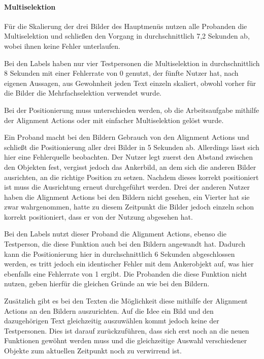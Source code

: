 \paragraph{Multiselektion}
Für die Skalierung der drei Bilder des Hauptmenüs nutzen alle Probanden die Multiselektion und schließen den Vorgang in durchschnittlich 7,2 Sekunden ab, wobei ihnen keine Fehler unterlaufen.

Bei den Labels haben nur vier Testpersonen die Multiselektion in durchschnittlich 8 Sekunden mit einer Fehlerrate von 0 genutzt, der fünfte Nutzer hat, nach eigenen Aussagen, aus Gewohnheit jeden Text einzeln skaliert, obwohl vorher für die Bilder die Mehrfachselektion verwendet wurde.

Bei der Positionierung muss unterschieden werden, ob die Arbeitsaufgabe mithilfe der Alignment Actions oder mit einfacher Multiselektion gelöst wurde.

Ein Proband macht bei den Bildern Gebrauch von den Alignment Actions und schließt die Positionierung aller drei Bilder in 5 Sekunden ab.
Allerdings lässt sich hier eine Fehlerquelle beobachten.
Der Nutzer legt zuerst den Abstand zwischen den Objekten fest, vergisst jedoch das Ankerbild, an dem sich die anderen Bilder ausrichten, an die richtige Position zu setzen.
Nachdem dieses korrekt positioniert ist muss die Ausrichtung erneut durchgeführt werden.
Drei der anderen Nutzer haben die Alignment Actions bei den Bildern nicht gesehen, ein Vierter hat sie zwar wahrgenommen, hatte zu diesem Zeitpunkt die Bilder jedoch einzeln schon korrekt positioniert, dass er von der Nutzung abgesehen hat.

Bei den Labels nutzt dieser Proband die Alignment Actions, ebenso die Testperson, die diese Funktion auch bei den Bildern angewandt hat.
Dadurch kann die Positionierung hier in durchschnittlich 6 Sekunden abgeschlossen werden, es tritt jedoch ein identischer Fehler mit dem Ankerobjekt auf, was hier ebenfalls eine Fehlerrate von 1 ergibt.
Die Probanden die diese Funktion nicht nutzen, geben hierfür die gleichen Gründe an wie bei den Bildern.

Zusätzlich gibt es bei den Texten die Möglichkeit diese mithilfe der Alignment Actions an den Bildern auszurichten.
Auf die Idee ein Bild und den dazugehörigen Text gleichzeitig auszuwählen kommt jedoch keine der Testpersonen.
Dies ist darauf zurückzuführen, dass sich erst noch an die neuen Funktionen gewöhnt werden muss und die gleichzeitige Auswahl verschiedener Objekte zum aktuellen Zeitpunkt noch zu verwirrend ist.

